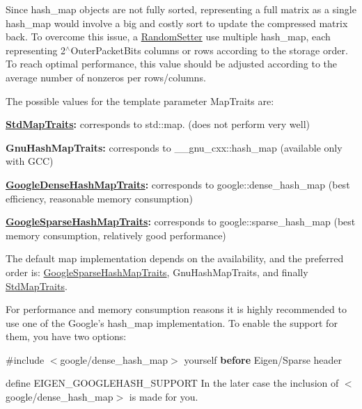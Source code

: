 Since hash\-\_\-map objects are not fully sorted, representing a full matrix as a single hash\-\_\-map would involve a big and costly sort to update the compressed matrix back. To overcome this issue, a \hyperlink{class_random_setter}{Random\-Setter} use multiple hash\-\_\-map, each representing 2$^\wedge$\-Outer\-Packet\-Bits columns or rows according to the storage order. To reach optimal performance, this value should be adjusted according to the average number of nonzeros per rows/columns.

The possible values for the template parameter Map\-Traits are\-:
\begin{DoxyItemize}
\item {\bfseries \hyperlink{struct_std_map_traits}{Std\-Map\-Traits}\-:} corresponds to std\-::map. (does not perform very well)
\item {\bfseries Gnu\-Hash\-Map\-Traits\-:} corresponds to \-\_\-\-\_\-gnu\-\_\-cxx\-::hash\-\_\-map (available only with G\-C\-C)
\item {\bfseries \hyperlink{struct_google_dense_hash_map_traits}{Google\-Dense\-Hash\-Map\-Traits}\-:} corresponds to google\-::dense\-\_\-hash\-\_\-map (best efficiency, reasonable memory consumption)
\item {\bfseries \hyperlink{struct_google_sparse_hash_map_traits}{Google\-Sparse\-Hash\-Map\-Traits}\-:} corresponds to google\-::sparse\-\_\-hash\-\_\-map (best memory consumption, relatively good performance)
\end{DoxyItemize}

The default map implementation depends on the availability, and the preferred order is\-: \hyperlink{struct_google_sparse_hash_map_traits}{Google\-Sparse\-Hash\-Map\-Traits}, Gnu\-Hash\-Map\-Traits, and finally \hyperlink{struct_std_map_traits}{Std\-Map\-Traits}.

For performance and memory consumption reasons it is highly recommended to use one of the Google's hash\-\_\-map implementation. To enable the support for them, you have two options\-:
\begin{DoxyItemize}
\item \#include $<$google/dense\-\_\-hash\-\_\-map$>$ yourself {\bfseries before} Eigen/\-Sparse header
\item define E\-I\-G\-E\-N\-\_\-\-G\-O\-O\-G\-L\-E\-H\-A\-S\-H\-\_\-\-S\-U\-P\-P\-O\-R\-T In the later case the inclusion of $<$google/dense\-\_\-hash\-\_\-map$>$ is made for you.
\end{DoxyItemize}

